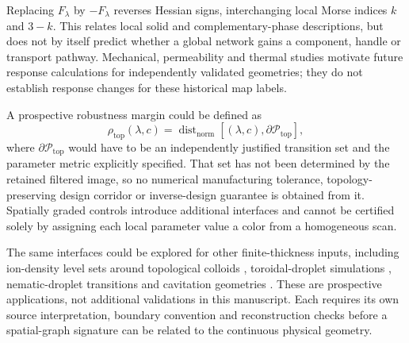Replacing $F_\lambda$ by $-F_\lambda$ reverses Hessian signs, interchanging local Morse indices $k$ and $3-k$. This relates local solid and complementary-phase descriptions, but does not by itself predict whether a global network gains a component, handle or transport pathway. Mechanical, permeability and thermal studies \cite{kg_maskery2018tpms,kg_castro2019tpms_permeability,kg_santos2020tpms_permeability,kg_liu2022tpms_topological_design,kg_gado2024tpms} motivate future response calculations for independently validated geometries; they do not establish response changes for these historical map labels.

A prospective robustness margin could be defined as
\begin{equation}
\rho_{\mathrm{top}}(\lambda,c)=\operatorname{dist}_{\mathrm{norm}}\!\left[(\lambda,c),\partial\mathcal P_{\mathrm{top}}\right],
\label{suppeq:tpms_topological_margin}
\end{equation}
where $\partial\mathcal P_{\mathrm{top}}$ would have to be an independently justified transition set and the parameter metric explicitly specified. That set has not been determined by the retained filtered image, so no numerical manufacturing tolerance, topology-preserving design corridor or inverse-design guarantee is obtained from it. Spatially graded controls introduce additional interfaces and cannot be certified solely by assigning each local parameter value a color from a homogeneous scan.

The same interfaces could be explored for other finite-thickness inputs, including ion-density level sets around topological colloids \cite{kg_everts2018doublelayer}, toroidal-droplet simulations \cite{kg_wu2024torusdroplets}, nematic-droplet transitions \cite{kg_koizumi2023nematic} and cavitation geometries \cite{kg_wang2014bubble,kg_wang2015bubble}. These are prospective applications, not additional validations in this manuscript. Each requires its own source interpretation, boundary convention and reconstruction checks before a spatial-graph signature can be related to the continuous physical geometry.
\FloatBarrier
